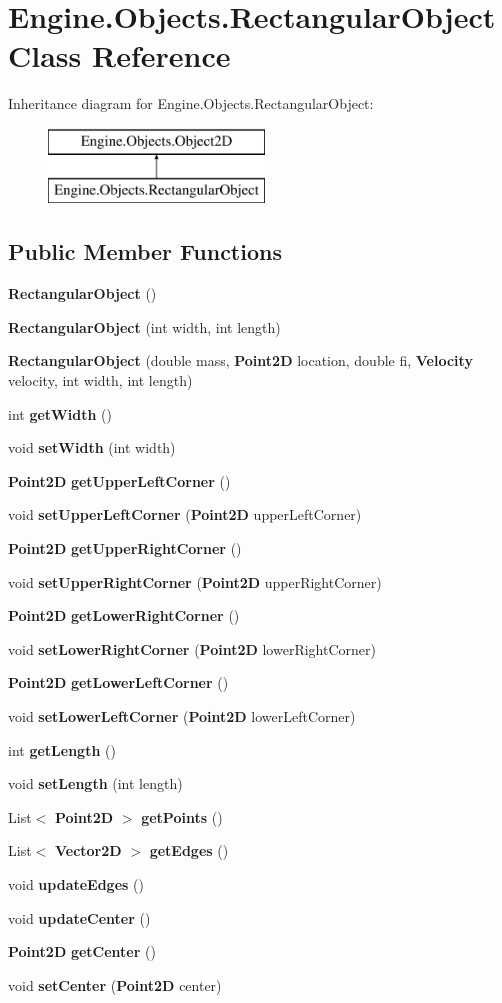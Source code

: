 \section{Engine.Objects.RectangularObject Class Reference}
\label{class_engine_1_1_objects_1_1_rectangular_object}
Inheritance diagram for Engine.Objects.RectangularObject:\begin{figure}[H]
\begin{center}
\leavevmode
\includegraphics[height=2.000000cm]{class_engine_1_1_objects_1_1_rectangular_object}
\end{center}
\end{figure}
\subsection*{Public Member Functions}
\begin{DoxyCompactItemize}
\item 
{\bf RectangularObject} ()
\item 
{\bf RectangularObject} (int width, int length)
\item 
{\bf RectangularObject} (double mass, {\bf Point2D} location, double fi, {\bf Velocity} velocity, int width, int length)
\item 
int {\bf getWidth} ()
\item 
void {\bf setWidth} (int width)
\item 
{\bf Point2D} {\bf getUpperLeftCorner} ()
\item 
void {\bf setUpperLeftCorner} ({\bf Point2D} upperLeftCorner)
\item 
{\bf Point2D} {\bf getUpperRightCorner} ()
\item 
void {\bf setUpperRightCorner} ({\bf Point2D} upperRightCorner)
\item 
{\bf Point2D} {\bf getLowerRightCorner} ()
\item 
void {\bf setLowerRightCorner} ({\bf Point2D} lowerRightCorner)
\item 
{\bf Point2D} {\bf getLowerLeftCorner} ()
\item 
void {\bf setLowerLeftCorner} ({\bf Point2D} lowerLeftCorner)
\item 
int {\bf getLength} ()
\item 
void {\bf setLength} (int length)
\item 
List$<$ {\bf Point2D} $>$ {\bf getPoints} ()
\item 
List$<$ {\bf Vector2D} $>$ {\bf getEdges} ()
\item 
void {\bf updateEdges} ()
\item 
void {\bf updateCenter} ()
\item 
{\bf Point2D} {\bf getCenter} ()
\item 
void {\bf setCenter} ({\bf Point2D} center)
\end{DoxyCompactItemize}
